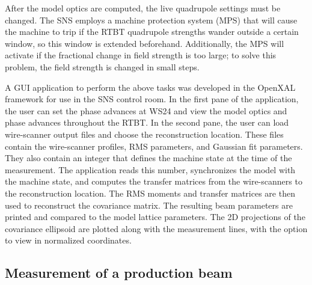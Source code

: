 After the model optics are computed, the live quadrupole settings must be changed. The SNS employs a machine protection system (MPS) that will cause the machine to trip if the RTBT quadrupole strengths wander outside a certain window, so this window is extended beforehand. Additionally, the MPS will activate if the fractional change in field strength is too large; to solve this problem, the field strength is changed in small steps. 

A GUI application to perform the above tasks was developed in the OpenXAL framework for use in the SNS control room. In the first pane of the application, the user can set the phase advances at WS24 and view the model optics and phase advances throughout the RTBT. In the second pane, the user can load wire-scanner output files and choose the reconstruction location. These files contain the wire-scanner profiles, RMS parameters, and Gaussian fit parameters. They also contain an integer that defines the machine state at the time of the measurement. The application reads this number, synchronizes the model with the machine state, and computes the transfer matrices from the wire-scanners to the reconstruction location. The RMS moments and transfer matrices are then used to reconstruct the covariance matrix. The resulting beam parameters are printed and compared to the model lattice parameters. The 2D projections of the covariance ellipsoid are plotted along with the measurement lines, with the option to view in normalized coordinates. 



\subsection{Measurement of a production beam}

